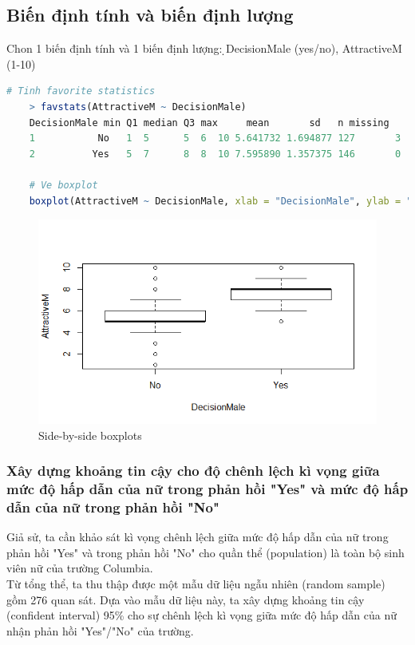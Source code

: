 \documentclass[a4paper,12pt]{article}
\begin{document}
	\subsection{Biến định tính và biến định lượng}
	Chon 1 biến định tính và 1 biến định lượng: ̣DecisionMale (yes/no), AttractiveM (1-10)
	\begin{lstlisting}[language = R]
	# Tinh favorite statistics
	> favstats(AttractiveM ~ DecisionMale)
	DecisionMale min Q1 median Q3 max     mean       sd   n missing
	1           No   1  5      5  6  10 5.641732 1.694877 127       3
	2          Yes   5  7      8  8  10 7.595890 1.357375 146       0
	
	# Ve boxplot
	boxplot(AttractiveM ~ DecisionMale, xlab = "DecisionMale", ylab = "AttractiveM")
	\end{lstlisting}
	\begin{figure}[H]
		\centering
		\includegraphics[width=0.7\linewidth]{Rplot5}
		\caption{Side-by-side boxplots}
		\label{fig:rplot5}
	\end{figure}
	
	\subsubsection{Xây dựng khoảng tin cậy cho độ chênh lệch kì vọng giữa mức độ hấp dẫn của nữ trong phản hồi "Yes" và mức độ hấp dẫn của nữ trong phản hồi "No"}
	
	Giả sử, ta cần khảo sát kì vọng chênh lệch giữa mức độ hấp dẫn của nữ trong phản hồi "Yes" và trong phản hồi "No" cho quần thể (population) là toàn bộ sinh viên nữ của trường Columbia.\\
	
	Từ tổng thể, ta thu thập được một mẫu dữ liệu ngẫu nhiên (random sample) gồm 276 quan sát. Dựa vào mẫu dữ liệu này, ta xây dựng khoảng tin cậy (confident interval) 95\% cho sự chênh lệch kì vọng giữa mức độ hấp dẫn của nữ nhận phản hồi "Yes"/"No" của trường.\\
	
\end{document}
